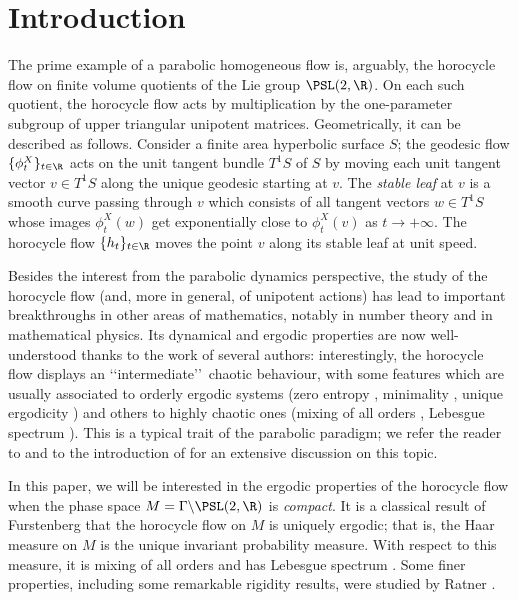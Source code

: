 \section{Introduction}\label{sec:introduction}

The prime example of a parabolic homogeneous flow is, arguably, the horocycle flow on finite volume quotients of the Lie group $\PSL(2,\R)$.
On each such quotient, the horocycle flow acts by multiplication by the one-parameter subgroup of upper triangular unipotent matrices.
Geometrically, it can be described as follows. Consider a finite area hyperbolic surface $S$; the geodesic flow $\{ \phi^X_t\}_{t \in \R}$ acts on the unit tangent bundle $T^1S$ of $S$ by moving each unit tangent vector $v \in T^1S$ along the unique geodesic starting at $v$. The \emph{stable leaf} at $v$ is a smooth curve passing through $v$ which consists of all tangent vectors $w \in T^1S$ whose images $\phi^X_t(w)$ get exponentially close to $\phi^X_t(v)$ as $t \to +\infty$. The horocycle flow $\{h_t\}_{t \in \R}$ moves the point $v$ along its stable leaf at unit speed.\enlargethispage{\baselineskip}

Besides the interest from the parabolic dynamics perspective, the study of the horocycle flow (and, more in general, of unipotent actions) has lead to important breakthroughs in other areas of mathematics, notably in number theory and in mathematical physics.
Its dynamical and ergodic properties are now well-understood thanks to the work of several authors: interestingly, the horocycle flow displays an \lq\lq intermediate\rq\rq\ chaotic behaviour, with some features which are usually associated to orderly ergodic systems (zero entropy \cite{Gur}, minimality \cite{Hed}, unique ergodicity \cite{Fur}) and others to highly chaotic ones (mixing of all orders \cite{Mar}, Lebesgue spectrum \cite{Par}). This is a typical trait of the parabolic paradigm; we refer the reader to \cite[Chap.\,8]{HasKat} and to the introduction of \cite{AFRU} for an extensive discussion on this topic.

In this paper, we will be interested in the ergodic properties of the horocycle flow when the phase space $M = \Gamma \backslash \PSL(2,\R)$ is \emph{compact}.
It is a classical result of Furstenberg \cite{Fur} that the horocycle flow on $M$ is uniquely ergodic; that is, the Haar measure on $M$ is the unique invariant probability measure.
With respect to this measure, it is mixing of all orders \cite{Mar} and has Lebesgue spectrum \cite{GeFo, Par}.
Some finer properties, including some remarkable rigidity results, were studied by Ratner \cite{Rat2, Rat4, Rat3}.

